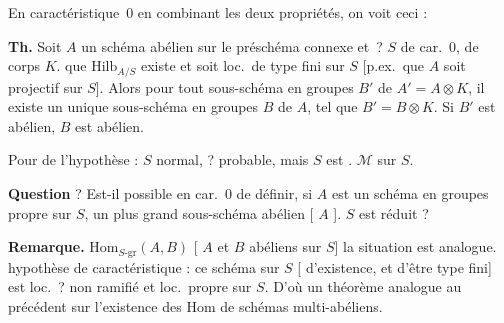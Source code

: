 \documentclass[11pt,a4paper]{article}
\begin{document}
En caractéristique~$0$ en combinant les deux propriétés, on voit ceci :

\textbf{Th.}  Soit $A$ un schéma abélien sur le
\struck{\ill{}} préschéma connexe et \,? $S$ de car.~$0$,
de corps $K$. 
 que $\mathrm{Hilb}_{A/S}$ existe et soit loc.\ de type
fini sur $S$ [p.ex.\ que $A$ soit projectif sur $S$]. Alors pour tout
sous-schéma en groupes $B'$ de $A' = A \otimes K$, il existe un unique
sous-schéma en groupes  $B$ de $A$, tel que
$B' = B \otimes K$. Si $B'$ est abélien, $B$ est abélien.

Pour   de l'hypothèse : $S$ normal,
   \ill{}  ? \struck{\ill{}} probable, mais \struck{\ill{}} \ill{}
 $S$ est . \struck{\ill{}}
  $\mathcal{M}$ 
  sur $S$.

\textbf{Question} ? Est-il possible en car.~$0$ de définir, si $A$ est un
\struck{\ill{}} schéma en groupes propre sur $S$, un plus grand
sous-schéma abélien [  \ill{} \ill{}
 $A$  \ill{}].  $S$ est
réduit ?

\textbf{Remarque.} \struck{\ill{}} 
$\mathrm{Hom}_{S\text{-}\mathrm{gr}}(A,B)$ [ $A$ et $B$
 abéliens sur $S$] la situation est
analogue.  hypothèse de \struck{\ill{}} caractéristique :
ce schéma sur $S$ [ d'existence, et d'être
  type fini] est loc.\ ? non ramifié
et loc.\ propre sur $S$. D'où un théorème analogue au précédent sur
l'existence des $\mathrm{Hom}$ de schémas multi-abéliens.
\end{document}
